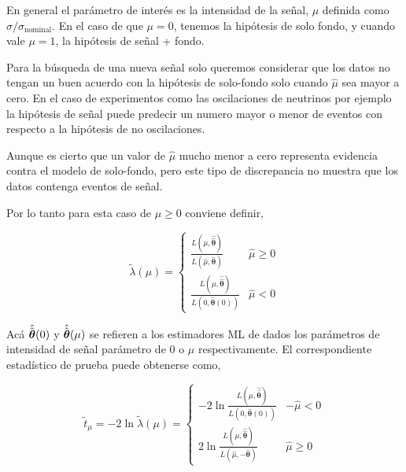 En general el parámetro de interés es la intensidad de la señal, $\mu$ definida
como $\sigma/\sigma_\text{nominal}$. En el caso de que $\mu = 0$, tenemos la
hipótesis de solo fondo, y cuando vale $\mu = 1$, la hipótesis de señal + fondo.



Para la búsqueda de una nueva señal solo queremos considerar que los datos no
tengan un buen acuerdo con la hipótesis de solo-fondo solo cuando $\hat{\mu}$
sea mayor a cero. En el caso de experimentos como las oscilaciones de neutrinos
por ejemplo la hipótesis de señal puede predecir un numero mayor o menor de
eventos con respecto a la hipótesis de no oscilaciones.

Aunque es cierto que un valor de $\hat{\mu}$ mucho menor a cero representa
evidencia contra el modelo de solo-fondo, pero este tipo de discrepancia no
muestra que los datos contenga eventos de señal.

Por lo tanto para esta caso de $\mu \geq 0$ conviene definir,

\begin{equation}
  \tilde{\lambda}(\mu) =
  \begin{cases}
    \frac{L(\mu, \hat{\hat{\bm{\theta}}})}{L(\hat{\mu}, \hat{\bm{\theta}})} &
    \hat{\mu} \geq 0 \\ \frac{L(\mu, \hat{\hat{\bm{\theta}}})}{L(0,
      \hat{\bm{\theta}}(0))} & \hat{\mu} < 0
  \end{cases}
\end{equation}

Acá $\hat{\hat{\bm{\theta}}}(0)$ y $\hat{\hat{\bm{\theta}}}(\mu)$ se refieren a los estimadores ML
de {\btheta} dados los parámetros de intensidad de señal parámetro de 0 o $\mu$
respectivamente. El correspondiente estadístico de prueba puede obtenerse como,

\begin{equation}
  \tilde{t}_\mu = -2 \ln \tilde{\lambda}(\mu) =
  \begin{cases}
    -2 \ln \frac{L(\mu, \hat{\hat{\bm{\theta}}})}{L(0, \hat{\bm{\theta}}(0))} &
    -\hat{\mu} < 0 \\ 2 \ln \frac{L(\mu, \hat{\hat{\bm{\theta}}})}{L(\hat{\mu},
    -\hat{\bm{\theta}})} & \hat{\mu} \geq 0
  \end{cases}
\end{equation}

